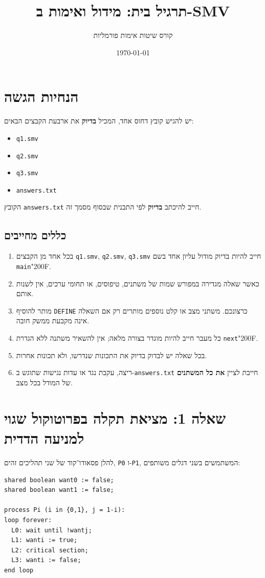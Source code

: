 \documentclass[11pt,a4paper]{article}
\title{תרגיל בית: מידול ואימות ב-\textenglish{SMV}}
\author{קורס שיטות אימות פורמליות}
\date{\today}
\newcommand{\RLM}{\char"200F}
\newenvironment{englishlisting}
  {\begin{english}\begin{flushleft}}
  {\end{flushleft}\end{english}}
\begin{document}
\maketitle

\section{הנחיות הגשה}
יש להגיש קובץ דחוס אחד, המכיל \textbf{בדיוק} את ארבעת הקבצים הבאים:
\begin{itemize}
  \item \texttt{q1.smv}
  \item \texttt{q2.smv}
  \item \texttt{q3.smv}
  \item \texttt{answers.txt}
\end{itemize}

\noindent
הקובץ \texttt{answers.txt} חייב להיכתב \textbf{בדיוק} לפי התבנית שבסוף מסמך זה.

\subsection*{כללים מחייבים}
\begin{enumerate}
  \item בכל אחד מן הקבצים \texttt{q1.smv}, \texttt{q2.smv}, \texttt{q3.smv} חייב להיות בדיוק מודול עליון אחד בשם \texttt{main}\RLM.
  \item כאשר שאלה מגדירה במפורש שמות של משתנים, טיפוסים, או תחומי ערכים, אין לשנות אותם.
  \item מותר להוסיף \texttt{DEFINE} כרצונכם. משתני מצב או קלט נוספים מותרים רק אם השאלה אינה מקבעת ממשק חובה.
  \item כל מעבר חייב להיות מוגדר בצורה מלאה; אין להשאיר משתנה ללא הגדרת \texttt{next}\RLM.
  \item בכל שאלה יש לבדוק בדיוק את התכונות שנדרשו, ולא תכונות אחרות.
  \item ריצה, עקבת נגד או עדות נגישות שתוגש ב-\texttt{answers.txt} חייבת לציין \textbf{את כל המשתנים} של המודל בכל מצב.
\end{enumerate}

\clearpage
\section{שאלה 1: מציאת תקלה בפרוטוקול שגוי למניעה הדדית}
להלן פסאודו־קוד של שני תהליכים זהים, \texttt{P0} ו-\texttt{P1}, המשתמשים בשני דגלים משותפים:

\begin{englishlisting}
\begin{lstlisting}
shared boolean want0 := false;
shared boolean want1 := false;

process Pi (i in {0,1}, j = 1-i):
loop forever:
  L0: wait until !wantj;
  L1: wanti := true;
  L2: critical section;
  L3: wanti := false;
end loop
\end{lstlisting}
\end{englishlisting}
\end{document}
